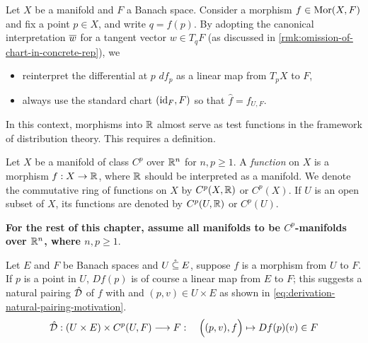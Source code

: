 \documentclass[../main-v2-manifolds.tex]{subfiles}
\begin{document}
Let $X$ be a manifold and $F$ a Banach space. Consider a morphism $f \in \operatorname{Mor}(X,F)$ and fix a point $p \in X$, and write $q = f(p)$. By adopting the canonical interpretation $\overline{w}$ for a tangent vector $w \in T_q F$ (as discussed in \cref{rmk:omission-of-chart-in-concrete-rep}), we 

\begin{itemize}
    \item reinterpret the differential at $p$ $df_p$ as a linear map from $T_p X$ to $F$,
    \item always use the standard chart $(\operatorname{id}_{F}, F)$ so that $\hat{f} = f_{U,F}$.
\end{itemize}


In this context, morphisms into $\mathbb{R}$ almost serve as test functions in the framework of distribution theory. This requires a definition.

\begin{definition}[Function on $X$]\label{def:function-on-X}
    Let $X$ be a manifold of class $C^p$ over ${\mathbb{R}^n}$ for $n,p\geq 1$. A \emph{function} on $X$ is a morphism $f: X\to\mathbb{R}$, where $\mathbb{R}$ should be interpreted as a manifold. We denote the commutative ring of functions on $X$ by $C^p(X,\mathbb{R})$ or $C^p(X)$. If $U$ is an open subset of $X$, its functions are denoted by $C^p(U,\mathbb{R})$ or $C^p(U)$.
\end{definition}
\textbf{For the rest of this chapter, assume all manifolds to be $C^p$-manifolds over ${\mathbb{R}^n}$, where $n,p \geq 1$}. 



Let $E$ and $F$ be Banach spaces and $U\:\mathring{\subseteq}\: E$, suppose $f$ is a morphism from $U$ to $F$. If $p$ is a point in $U$, $Df(p)$ is of course a linear map from $E$ to $F$; this suggests a natural pairing $\hat{\mathcal{D}}$ of $f$ with and $(p,v)\in U\times E$ as shown in \cref{eq:derivation-natural-pairing-motivation}.
\begin{equation}\label{eq:derivation-natural-pairing-motivation}
    \hat{\mathcal{D}}: (U\times E)\times C^p(U,F)\longrightarrow F:\quad \qty\Big((p,v), f)\mapsto Df(p)(v)\in F
\end{equation}
\end{document}
